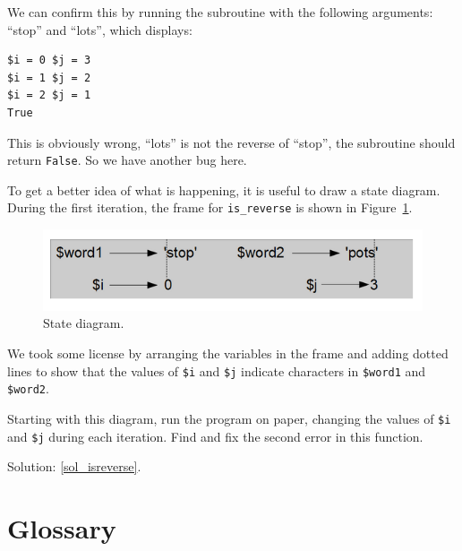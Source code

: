 We can confirm this by running the subroutine with the 
following arguments: ``stop'' and ``lots'', which displays:

\begin{verbatim}
$i = 0 $j = 3
$i = 1 $j = 2
$i = 2 $j = 1
True
\end{verbatim}
%

This is obviously wrong, ``lots'' is not the reverse of 
``stop'', the subroutine should return {\tt False}. So we 
have another bug here.

To get a better idea of what is
happening, it is useful to draw a state diagram.  During the first
iteration, the frame for \verb"is_reverse" is shown in
Figure~\ref{fig.state4}.   

\begin{figure}
\centerline
{\includegraphics[scale=0.5]{figs/state6.png}}
\caption{State diagram.}
\label{fig.state4}
\end{figure}

We took some license by arranging the variables in the frame
and adding dotted lines to show that the values of {\tt \$i} 
and {\tt \$j} indicate characters in {\tt \$word1} and 
{\tt \$word2}.

Starting with this diagram, run the program on paper, changing 
the values of {\tt \$i} and {\tt \$j} during each iteration. 
Find and fix the second error in this function.

Solution: \ref{sol_isreverse}.
\label{isreverse}


\section{Glossary}

